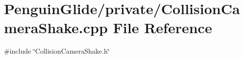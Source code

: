 \section{Penguin\+Glide/private/\+Collision\+Camera\+Shake.cpp File Reference}
\label{_collision_camera_shake_8cpp}
{\ttfamily \#include \char`\"{}Collision\+Camera\+Shake.\+h\char`\"{}}\newline
